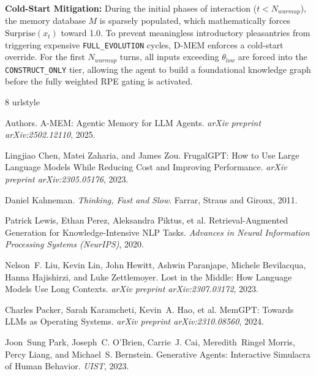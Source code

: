\documentclass{article}
\begin{document}
\textbf{Cold-Start Mitigation:}
During the initial phases of interaction ($t < N_{warmup}$), the memory database $M$ is sparsely populated, which mathematically forces $\text{Surprise}(x_t)$ toward 1.0. To prevent meaningless introductory pleasantries from triggering expensive \texttt{FULL\_EVOLUTION} cycles, D-MEM enforces a cold-start override. For the first $N_{warmup}$ turns, all inputs exceeding $\theta_{low}$ are forced into the \texttt{CONSTRUCT\_ONLY} tier, allowing the agent to build a foundational knowledge graph before the fully weighted RPE gating is activated.

\begin{thebibliography}{8}
\providecommand{\natexlab}[1]{#1}
\providecommand{\url}[1]{\texttt{#1}}
\expandafter\ifx\csname urlstyle\endcsname\relax
  \providecommand{\doi}[1]{doi: #1}\else
  \providecommand{\doi}{doi: \begingroup \urlstyle{rm}\Url}\fi

Authors.
\newblock A-MEM: Agentic Memory for LLM Agents.
\newblock \emph{arXiv preprint arXiv:2502.12110}, 2025.

Lingjiao Chen, Matei Zaharia, and James Zou.
\newblock FrugalGPT: How to Use Large Language Models While Reducing Cost and Improving Performance.
\newblock \emph{arXiv preprint arXiv:2305.05176}, 2023.

Daniel Kahneman.
\newblock \emph{Thinking, Fast and Slow}.
\newblock Farrar, Straus and Giroux, 2011.

Patrick Lewis, Ethan Perez, Aleksandra Piktus, et al.
\newblock Retrieval-Augmented Generation for Knowledge-Intensive NLP Tasks.
\newblock \emph{Advances in Neural Information Processing Systems (NeurIPS)}, 2020.

Nelson~F. Liu, Kevin Lin, John Hewitt, Ashwin Paranjape, Michele Bevilacqua,
  Hanna Hajishirzi, and Luke Zettlemoyer.
\newblock Lost in the Middle: How Language Models Use Long Contexts.
\newblock \emph{arXiv preprint arXiv:2307.03172}, 2023.

Charles Packer, Sarah Karamcheti, Kevin~A. Hao, et al.
\newblock MemGPT: Towards LLMs as Operating Systems.
\newblock \emph{arXiv preprint arXiv:2310.08560}, 2024.

Joon~Sung Park, Joseph~C. O'Brien, Carrie~J. Cai, Meredith~Ringel Morris,
  Percy Liang, and Michael~S. Bernstein.
\newblock Generative Agents: Interactive Simulacra of Human Behavior.
\newblock \emph{UIST}, 2023.


\end{thebibliography}
\end{document}
